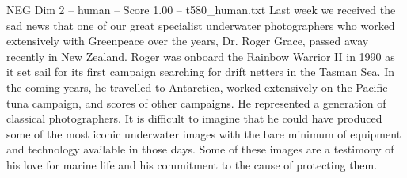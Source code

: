 \begin{textsample}{NEG Dim 2 – human – Score 1.00 – t580\_human.txt}  \label{ex:f2_neg_035}
Last week we received the sad news that one of our great specialist underwater photographers who worked extensively with Greenpeace over the years, Dr.
Roger Grace, passed away recently in New Zealand.
Roger was onboard the Rainbow Warrior II in 1990 as it set sail for its first campaign searching for drift netters in the Tasman Sea.
In the coming years, he travelled to Antarctica, worked extensively on the Pacific tuna campaign, and scores of other campaigns.
He represented a generation of classical photographers.
It is difficult to imagine that he could have produced some of the most iconic underwater images with the bare minimum of equipment and technology available in those days.
Some of these images are a testimony of his love for marine life and his commitment to the cause of protecting them.

\end{textsample}
